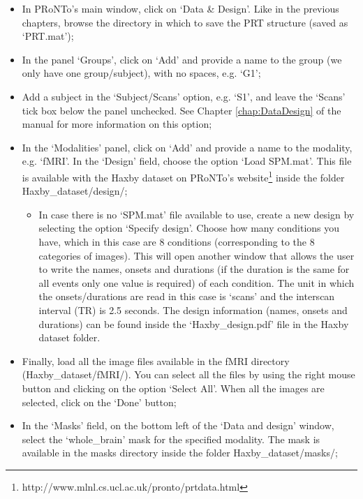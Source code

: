\begin{itemize}
	
	\item In PRoNTo's main window, click on `Data \& Design'. Like in the previous chapters, browse the directory in which to save the PRT structure (saved as `PRT.mat');
	
	\item In the panel `Groups', click on `Add' and provide a name to the group (we only have one group/subject), with no spaces, e.g. `G1';
	
	\item Add a subject in the `Subject/Scans' option, e.g. `S1', and leave the `Scans' tick box below the panel unchecked. See Chapter \ref{chap:DataDesign} of the manual for more information on this option;
	
	\item In the `Modalities' panel, click on `Add' and provide a name to the modality, e.g. `fMRI'. In the `Design' field, choose the option `Load SPM.mat'. This file is available with the Haxby dataset on PRoNTo's website\footnote{http://www.mlnl.cs.ucl.ac.uk/pronto/prtdata.html} inside the folder Haxby\_dataset/design/;
	

	\begin{itemize}
	
		\item In case there is no `SPM.mat' file available to use, create a new design by selecting the option `Specify design'. Choose how many conditions you have, which in this case are 8 conditions (corresponding to the 8 categories of images). This will open another window that allows the user to write the names, onsets and durations (if the duration is the same for all events only one value is required) of each condition. The unit in which the onsets/durations are read in this case is `scans' and the interscan interval (TR) is 2.5 seconds. The design information (names, onsets and durations) can be found inside the `Haxby\_design.pdf' file in the Haxby dataset folder. 
	
	\end{itemize}
	
	
	\item Finally, load all the image files available in the fMRI directory (Haxby\_dataset/fMRI/). You can select all the files by using the right mouse button and clicking on the option `Select All'. When all the images are selected, click on the `Done' button;
	
	\item In the `Masks' field, on the bottom left of the `Data and design' window, select the `whole\_brain' mask for the specified modality. The mask is available in the masks directory inside the folder Haxby\_dataset/masks/;


\end{itemize}
